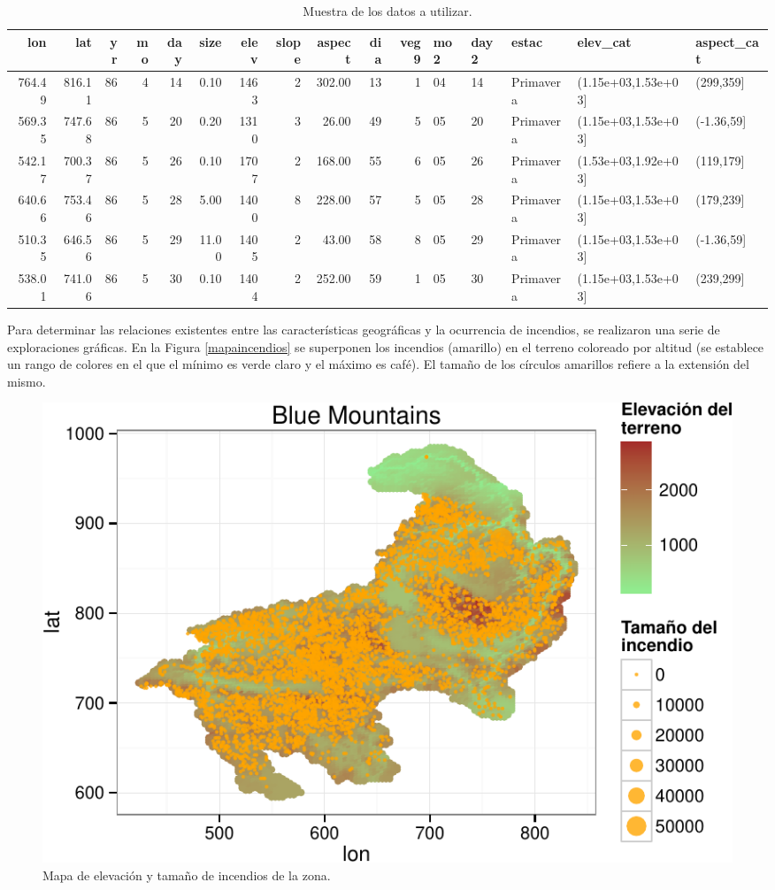 \documentclass[12,]{article}
\begin{document}
\begin{table}[H]
\centering
{\tiny
\begin{tabular}{rrrrrrrrrrrlllll}
  \hline
lon & lat & yr & mo & day & size & elev & slope & aspect & dia & veg9 & mo2 & day2 & estac & elev\_cat & aspect\_cat \\ 
  \hline
764.49 & 816.11 &  86 &   4 &  14 & 0.10 & 1463 &   2 & 302.00 &  13 &   1 & 04 & 14 & Primavera & (1.15e+03,1.53e+03] & (299,359] \\ 
  569.35 & 747.68 &  86 &   5 &  20 & 0.20 & 1310 &   3 & 26.00 &  49 &   5 & 05 & 20 & Primavera & (1.15e+03,1.53e+03] & (-1.36,59] \\ 
  542.17 & 700.37 &  86 &   5 &  26 & 0.10 & 1707 &   2 & 168.00 &  55 &   6 & 05 & 26 & Primavera & (1.53e+03,1.92e+03] & (119,179] \\ 
  640.66 & 753.46 &  86 &   5 &  28 & 5.00 & 1400 &   8 & 228.00 &  57 &   5 & 05 & 28 & Primavera & (1.15e+03,1.53e+03] & (179,239] \\ 
  510.35 & 646.56 &  86 &   5 &  29 & 11.00 & 1405 &   2 & 43.00 &  58 &   8 & 05 & 29 & Primavera & (1.15e+03,1.53e+03] & (-1.36,59] \\ 
  538.01 & 741.06 &  86 &   5 &  30 & 0.10 & 1404 &   2 & 252.00 &  59 &   1 & 05 & 30 & Primavera & (1.15e+03,1.53e+03] & (239,299] \\ 
   \hline
\end{tabular}
}
\caption{Muestra de los datos a utilizar.} 
\end{table}

Para determinar las relaciones existentes entre las características
geográficas y la ocurrencia de incendios, se realizaron una serie de
exploraciones gráficas. En la Figura \ref{mapaincendios} se superponen
los incendios (amarillo) en el terreno coloreado por altitud (se
establece un rango de colores en el que el mínimo es verde claro y el
máximo es café). El tamaño de los círculos amarillos refiere a la
extensión del mismo.

\begin{figure}[htbp]
\centering
\includegraphics{tarea2_files/figure-latex/mapaincendios-1.pdf}
\caption{Mapa de elevación y tamaño de incendios de la zona.
$\label{mapaincendios}$}
\end{figure}
\end{document}

